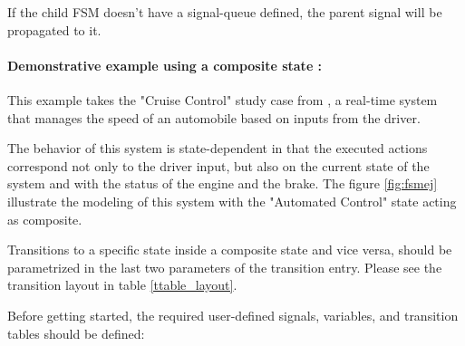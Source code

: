 \documentclass{article}
\begin{document}
\hrulefill
\newline

\begin{tcolorbox}
\HandRight If the child FSM doesn't have a signal-queue defined, the parent signal will be propagated to it.
\end{tcolorbox}


\paragraph{Demonstrative example using a composite state :} This example takes the "Cruise Control" study case from \cite{gomaa}, a real-time system that manages the speed of an automobile based on inputs from the driver. 

The behavior of this system is state-dependent in that the executed actions correspond not only to the driver input, but also on the current state of the system and with the status of the engine and the brake. 
The figure \ref{fig:fsmej} illustrate the modeling of this system with the "Automated Control" state acting as composite. \\



\begin{tcolorbox}
\HandRight Transitions to a specific state inside a composite state and vice versa, should be parametrized in the last two parameters of the transition entry. Please see the transition layout in table \ref{ttable_layout}.
\end{tcolorbox}



Before getting started, the required user-defined signals, variables, and transition tables should be defined:
\end{document}
